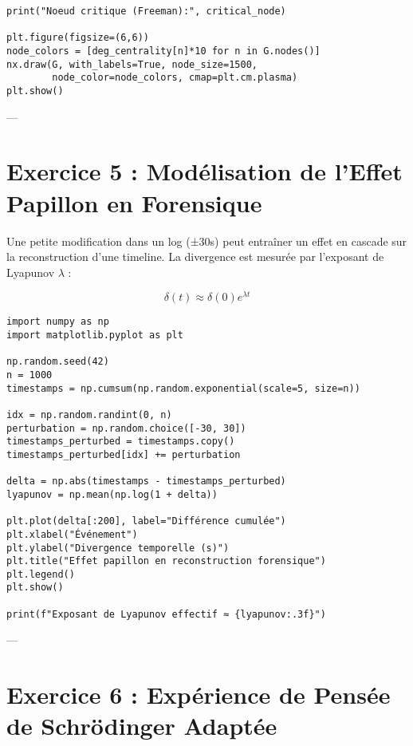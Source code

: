 \documentclass[memoire, 12pt]{report}
\begin{document}
\begin{titlepage}
\begin{lstlisting}[style=python, caption={Analyse de graphes en Python avec NetworkX}]
print("Noeud critique (Freeman):", critical_node)

plt.figure(figsize=(6,6))
node_colors = [deg_centrality[n]*10 for n in G.nodes()]
nx.draw(G, with_labels=True, node_size=1500,
        node_color=node_colors, cmap=plt.cm.plasma)
plt.show()
\end{lstlisting}

---

\section*{Exercice 5 : Modélisation de l’Effet Papillon en Forensique}

Une petite modification dans un log (±30s) peut entraîner un effet en cascade sur la reconstruction d’une timeline.  
La divergence est mesurée par l’exposant de Lyapunov $\lambda$ :

\[
\delta(t) \approx \delta(0)e^{\lambda t}
\]

\begin{lstlisting}[style=python, caption={Simulation de l’effet papillon en Python}]
import numpy as np
import matplotlib.pyplot as plt

np.random.seed(42)
n = 1000
timestamps = np.cumsum(np.random.exponential(scale=5, size=n))

idx = np.random.randint(0, n)
perturbation = np.random.choice([-30, 30])
timestamps_perturbed = timestamps.copy()
timestamps_perturbed[idx] += perturbation

delta = np.abs(timestamps - timestamps_perturbed)
lyapunov = np.mean(np.log(1 + delta))

plt.plot(delta[:200], label="Différence cumulée")
plt.xlabel("Événement")
plt.ylabel("Divergence temporelle (s)")
plt.title("Effet papillon en reconstruction forensique")
plt.legend()
plt.show()

print(f"Exposant de Lyapunov effectif ≈ {lyapunov:.3f}")
\end{lstlisting}

---





\section*{Exercice 6 : Expérience de Pensée de Schrödinger Adaptée}


\end{titlepage}
\end{document}

